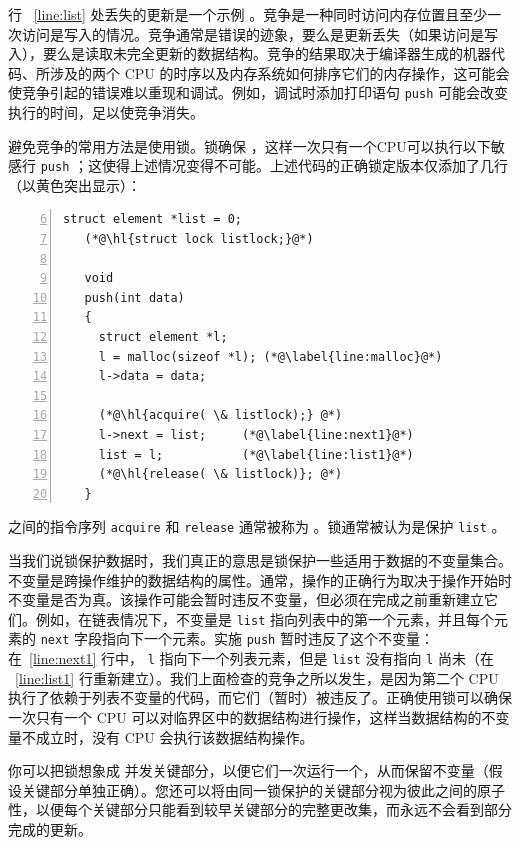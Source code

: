 行 ~\ref{line:list}    处丢失的更新是一个示例
        。竞争是一种同时访问内存位置且至少一次访问是写入的情况。竞争通常是错误的迹象，要么是更新丢失（如果访问是写入），要么是读取未完全更新的数据结构。竞争的结果取决于编译器生成的机器代码、所涉及的两个 CPU 的时序以及内存系统如何排序它们的内存操作，这可能会使竞争引起的错误难以重现和调试。例如，调试时添加打印语句
    \lstinline{push}    可能会改变执行的时间，足以使竞争消失。  

避免竞争的常用方法是使用锁。锁确保
        ，这样一次只有一个CPU可以执行以下敏感行
    \lstinline{push}    ；这使得上述情况变得不可能。上述代码的正确锁定版本仅添加了几行（以黄色突出显示）：
    \begin{lstlisting}[numbers=left,firstnumber=6]
   struct element *list = 0;
   (*@\hl{struct lock listlock;}@*)
    	
   void
   push(int data)
   {
     struct element *l;
     l = malloc(sizeof *l); (*@\label{line:malloc}@*)
     l->data = data;
   
     (*@\hl{acquire( \& listlock);} @*)
     l->next = list;     (*@\label{line:next1}@*)
     list = l;           (*@\label{line:list1}@*)
     (*@\hl{release( \& listlock)}; @*)
   }
\end{lstlisting}    之间的指令序列
    \lstinline{acquire}    和
    \lstinline{release}    通常被称为
        。锁通常被认为是保护
    \lstinline{list}    。  

当我们说锁保护数据时，我们真正的意思是锁保护一些适用于数据的不变量集合。不变量是跨操作维护的数据结构的属性。通常，操作的正确行为取决于操作开始时不变量是否为真。该操作可能会暂时违反不变量，但必须在完成之前重新建立它们。例如，在链表情况下，不变量是
    \lstinline{list}    指向列表中的第一个元素，并且每个元素的
    \lstinline{next}    字段指向下一个元素。实施
    \lstinline{push}    暂时违反了这个不变量：在~\ref{line:next1}    行中，
    \lstinline{l}    指向下一个列表元素，但是
    \lstinline{list}    没有指向
    \lstinline{l}    尚未（在 ~\ref{line:list1}    行重新建立）。我们上面检查的竞争之所以发生，是因为第二个 CPU 执行了依赖于列表不变量的代码，而它们（暂时）被违反了。正确使用锁可以确保一次只有一个 CPU 可以对临界区中的数据结构进行操作，这样当数据结构的不变量不成立时，没有 CPU 会执行该数据结构操作。  

你可以把锁想象成
        并发关键部分，以便它们一次运行一个，从而保留不变量（假设关键部分单独正确）。您还可以将由同一锁保护的关键部分视为彼此之间的原子性，以便每个关键部分只能看到较早关键部分的完整更改集，而永远不会看到部分完成的更新。  

